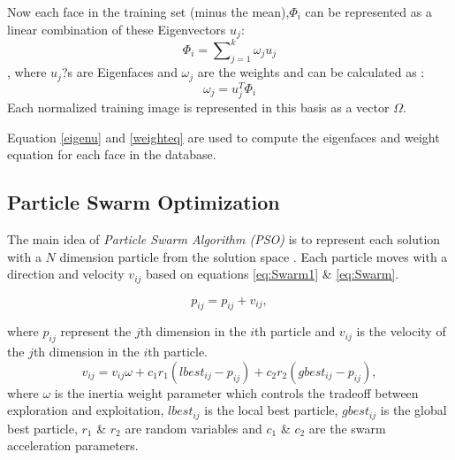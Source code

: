 \documentclass[a4paper,twoside]{article}
\begin{document}
\begin{enumerate}
Now each face in the training set (minus the mean),$\Phi_i$  can be represented as a linear combination of these Eigenvectors   $u_j$:
  \begin{equation}
\label{eqphi}
\Phi_i  = \sum\nolimits_{j = 1}^k {\omega_j u_j}
  \end{equation}
, where  $u_j$?s are Eigenfaces and $\omega_j$ are the weights and can be calculated as :
\begin{equation}
\label{weighteq}
\omega _j  = u_j^T \Phi _i
\end{equation}
Each normalized training image is represented in this basis as a vector $\Omega$.
\end{enumerate}

Equation \ref{eigenu} and \ref{weighteq} are used to compute the eigenfaces and weight equation for each face in the database. 
\subsection{Particle Swarm Optimization}
\label{sec:ParticleSwarmAlgorithm}
 The main idea of \textit{Particle Swarm Algorithm (PSO)} is to represent each solution with a $N$ dimension particle from the solution space \cite{PSOFirst}. Each particle moves with a direction and velocity $v_{ij}$ based on equations \ref{eq:Swarm1} \& \ref{eq:Swarm}.

\begin{equation}
p_{ij}=p_{ij}+v_{ij},
\label{eq:Swarm1}
\end{equation}

where $p_{ij}$ represent the $j$th dimension in the $i$th particle and $v_{ij}$ is the velocity of the $j$th dimension in the $i$th particle.
 \begin{equation}
v_{ij}  = v_{ij} \omega + c_1 r_1 (lbest_{ij}  - p_{ij} ) + c_2 r_2 (gbest_{ij}  - p_{ij} ),
\label{eq:Swarm}
\end{equation}
 where $\omega$ is the inertia weight parameter which controls the tradeoff between exploration and exploitation,  $lbest_{ij}$ is the local best particle, $gbest_{ij}$ is the global best particle, $r_1$ \& $r_2$ are random variables and $c_1$ \& $c_2$ are the swarm acceleration parameters.
\end{document}
